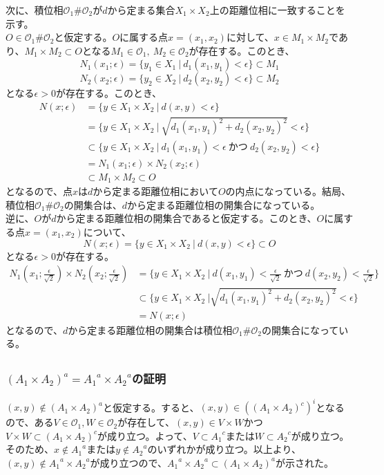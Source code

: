 \documentclass{jsarticle}
\begin{document}
次に、積位相$\mathcal{O}_1\#\mathcal{O}_2$が$d$から定まる集合$X_1\times X_2$上の距離位相に一致することを示す。\\
$O\in\mathcal{O}_1\#\mathcal{O}_2$と仮定する。$O$に属する点$x=(x_1,x_2)$に対して、$x\in M_1\times M_2$であり、$M_1\times M_2\subset O$となる$M_1\in\mathcal{O}_1,\ M_2\in\mathcal{O}_2$が存在する。このとき、
\[N_1(x_1;\epsilon)=\{y_1\in X_1 \ |\ d_1(x_1,y_1)<\epsilon\}\subset M_1\]
\[N_2(x_2;\epsilon)=\{y_2\in X_2 \ |\ d_2(x_2,y_2)<\epsilon\}\subset M_2\]
となる$\epsilon>0$が存在する。このとき、
\begin{align*}
N(x;\epsilon)&=\{y\in X_1\times X_2\ |\ d(x,y)<\epsilon\}\\
&=\{y\in X_1\times X_2\ |\ \sqrt{{d_1(x_1,y_1)}^2+{d_2(x_2,y_2)}^2}<\epsilon\}\\
&\subset\{y\in X_1\times X_2\ |\ d_1(x_1,y_1)<\epsilon\ かつ\ d_2(x_2,y_2)<\epsilon\}\\
&= N_1(x_1;\epsilon)\times N_2(x_2;\epsilon)\\
&\subset M_1\times M_2\subset O
\end{align*}
となるので、点$x$は$d$から定まる距離位相において$O$の内点になっている。結局、積位相$\mathcal{O}_1\#\mathcal{O}_2$の開集合は、$d$から定まる距離位相の開集合になっている。\\
逆に、$O$が$d$から定まる距離位相の開集合であると仮定する。このとき、$O$に属する点$x=(x_1,x_2)$について、
\[N(x;\epsilon)=\{y\in X_1\times X_2\ |\ d(x,y)<\epsilon\}\subset O\]
となる$\epsilon>0$が存在する。
\begin{align*}
N_1(x_1;\frac{\epsilon}{\sqrt{2}})\times N_2(x_2;\frac{\epsilon}{\sqrt{2}})&=\{y\in X_1\times X_2\ |\ d(x_1,y_1)<\frac{\epsilon}{\sqrt{2}}\ かつ\ d(x_2,y_2)<\frac{\epsilon}{\sqrt{2}}\}\\
&\subset\{y\in X_1\times X_2\ |\sqrt{{d_1(x_1,y_1)}^2+{d_2(x_2,y_2)}^2}<\epsilon\}\\
&=N(x;\epsilon)
\end{align*}
となるので、$d$から定まる距離位相の開集合は積位相$\mathcal{O}_1\#\mathcal{O}_2$の開集合になっている。


\subsection{}

\subsubsection{$(A_1\times A_2)^a={A_1}^a\times {A_2}^a$の証明}
$(x,y)\notin(A_1\times A_2)^a$と仮定する。すると、$(x,y)\in((A_1\times A_2)^c)^i$となるので、ある$V\in\mathcal{O}_1,W\in\mathcal{O}_2$が存在して、$(x,y)\in V\times W$かつ$V\times W\subset (A_1\times A_2)^c$が成り立つ。よって、$V\subset {A_1}^c$または$W\subset {A_2}^c$が成り立つ。そのため、$x\notin {A_1}^a$または$y\notin {A_2}^a$のいずれかが成り立つ。以上より、$(x,y)\notin {A_1}^a\times{A_2}^a$が成り立つので、${A_1}^a\times{A_2}^a\subset(A_1\times A_2)^a$が示された。\\
\end{document}
